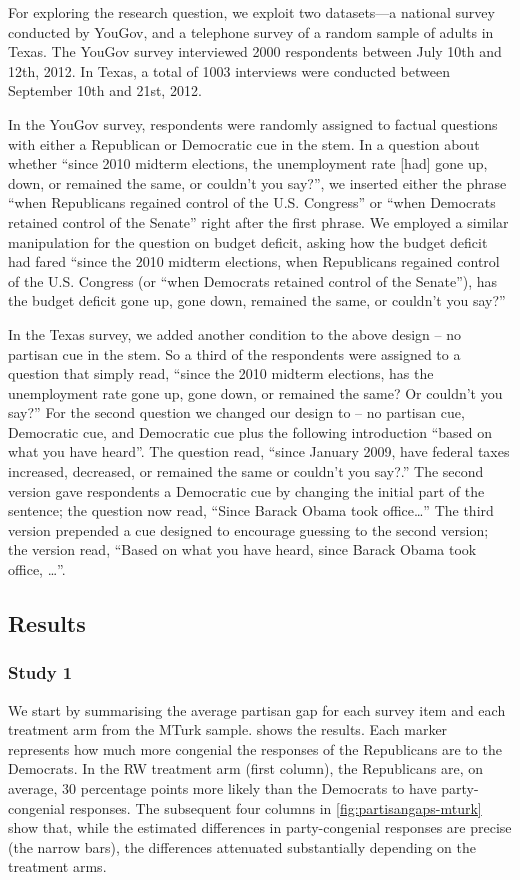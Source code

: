 \documentclass[12pt, letterpaper]{article}
\begin{document}
For exploring the research question, we exploit two datasets---a national survey conducted by YouGov, and a telephone survey of a random sample of adults in Texas. The YouGov survey interviewed 2000 respondents between July 10th and 12th, 2012.  In Texas, a total of 1003 interviews were conducted between September 10th and 21st, 2012.

In the YouGov survey, respondents were randomly assigned to factual questions with either a Republican or Democratic cue in the stem. In a question about whether ``since 2010 midterm elections, the unemployment rate [had] gone up, down, or remained the same, or couldn't you say?'', we inserted either the phrase ``when Republicans regained control of the U.S. Congress'' or ``when Democrats retained control of the Senate'' right after the first phrase. We employed a similar manipulation for the question on budget deficit, asking how the budget deficit had fared ``since the 2010 midterm elections, when Republicans regained control of the U.S. Congress (or ``when Democrats retained control of the Senate''), has the budget deficit gone up, gone down, remained the same, or couldn't you say?''

In the Texas survey, we added another condition to the above design – no partisan cue in the stem. So a third of the respondents were assigned to a question that simply read, ``since the 2010 midterm elections, has the unemployment rate gone up, gone down, or remained the same?  Or couldn’t you say?'' For the second question we changed our design to – no partisan cue, Democratic cue, and Democratic cue plus the following introduction ``based on what you have heard''. The question read, ``since January 2009, have federal taxes increased, decreased, or remained the same or couldn’t you say?.'' The second version gave respondents a Democratic cue by changing the initial part of the sentence; the question now read, ``Since Barack Obama took office\ldots''  The third version prepended a cue designed to encourage guessing to the second version; the version read, ``Based on what you have heard, since Barack Obama took office, \ldots''.

\subsection*{Results}

\subsubsection*{Study 1}
We start by summarising the average partisan gap for each survey item and each treatment arm from the MTurk sample.  shows the results. Each marker represents how much more congenial the responses of the Republicans are to the Democrats. In the RW treatment arm (first column), the Republicans are, on average, 30 percentage points more likely than the Democrats to have party-congenial responses. The subsequent four columns in \cref{fig:partisangaps-mturk} show that, while the estimated differences in party-congenial responses are precise (the narrow bars), the differences attenuated substantially depending on the treatment arms.
\end{document}
